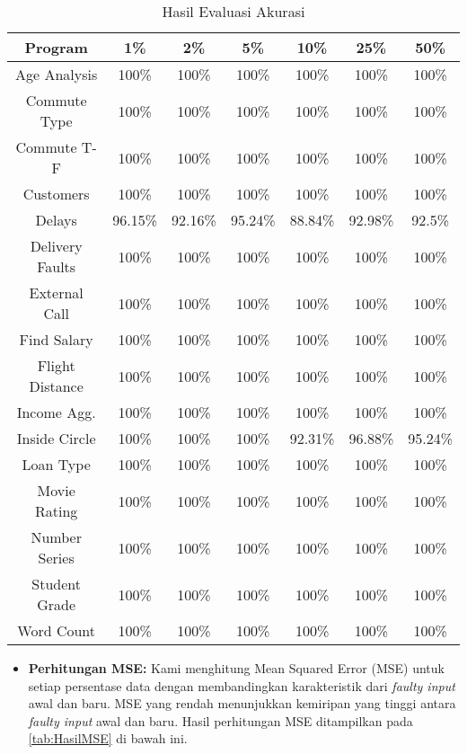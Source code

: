 \begin{enumerate}[topsep=0pt]
      
      \begin{table}[H]
      \centering
      \caption{Hasil Evaluasi Akurasi}
      \label{tab:HasilAkurasi}
      \begin{tabular}{|c|c|c|c|c|c|c|}
      \hline
      \textbf{Program} & \textbf{1\%} & \textbf{2\%} & \textbf{5\%} & \textbf{10\%} & \textbf{25\%} & \textbf{50\%} \\
      \hline
      Age Analysis & 100\% & 100\% & 100\% & 100\% & 100\% & 100\% \\
      \hline
      Commute Type & 100\% & 100\% & 100\% & 100\% & 100\% & 100\% \\
      \hline
      Commute T-F & 100\% & 100\% & 100\% & 100\% & 100\% & 100\% \\
      \hline
      Customers & 100\% & 100\% & 100\% & 100\% & 100\% & 100\% \\
      \hline
      Delays & 96.15\% & 92.16\% & 95.24\% & 88.84\% & 92.98\% & 92.5\% \\
      \hline
      Delivery Faults & 100\% & 100\% & 100\% & 100\% & 100\% & 100\% \\
      \hline
      External Call & 100\% & 100\% & 100\% & 100\% & 100\% & 100\% \\
      \hline
      Find Salary & 100\% & 100\% & 100\% & 100\% & 100\% & 100\% \\
      \hline
      Flight Distance & 100\% & 100\% & 100\% & 100\% & 100\% & 100\% \\
      \hline
      Income Agg. & 100\% & 100\% & 100\% & 100\% & 100\% & 100\% \\
      \hline
      Inside Circle & 100\% & 100\% & 100\% & 92.31\% & 96.88\% & 95.24\% \\
      \hline
      Loan Type & 100\% & 100\% & 100\% & 100\% & 100\% & 100\% \\
      \hline
      Movie Rating & 100\% & 100\% & 100\% & 100\% & 100\% & 100\% \\
      \hline
      Number Series & 100\% & 100\% & 100\% & 100\% & 100\% & 100\% \\
      \hline
      Student Grade & 100\% & 100\% & 100\% & 100\% & 100\% & 100\% \\
      \hline
      Word Count & 100\% & 100\% & 100\% & 100\% & 100\% & 100\% \\
      \hline
      \end{tabular}
      \end{table}
      
      \begin{itemize}
          \item \textbf{Perhitungan MSE:} Kami menghitung Mean Squared Error (MSE) untuk setiap persentase data dengan membandingkan karakteristik dari \emph{faulty input} awal dan baru. MSE yang rendah menunjukkan kemiripan yang tinggi antara \emph{faulty input} awal dan baru.
          Hasil perhitungan MSE ditampilkan pada \ref{tab:HasilMSE} di bawah ini.
      \end{itemize}
  

\end{enumerate}
